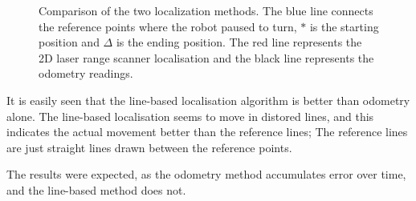 \begin{figure}[H]
\centering
{}
\caption[Comparison of the two localization methods.]{Comparison of the two localization methods.
The blue line connects the reference points where the robot paused to turn,
$*$ is the starting position and $\Delta$ is the ending position.
The red line represents the 2D laser range scanner localisation and the black line represents the odometry readings.}
\label{fig:comparisonOfEncoderVSScanner}
\end{figure}

It is easily seen that the line-based localisation algorithm is better than odometry alone.
The line-based localisation seems to move in distored lines, and this indicates the actual movement
better than the reference lines; The reference lines are just straight lines drawn between the reference points.


The results were expected, as the odometry method accumulates error over time, and the line-based method does not.

